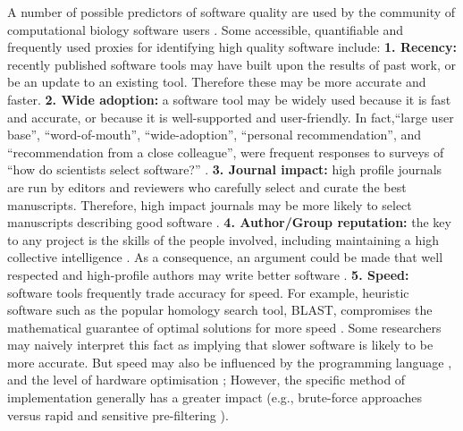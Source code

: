 \documentclass[fleqn,10pt]{SelfArx} %
\begin{document}
A number of possible predictors of software quality are used by the
community of computational biology software users \cite{Hannay2009-cf,Joppa2013-vj,Loman2015-bw}. 
Some accessible, quantifiable and frequently used proxies for identifying high quality
software include: \textbf{1. Recency:} recently published software
tools may have built upon the results of past work, or be an update to
an existing tool. Therefore these may be more accurate and
faster. \textbf{2. Wide adoption:} a software tool may be widely used
because it is fast and accurate, or because it is well-supported and
user-friendly. In fact,``large user base'', ``word-of-mouth'',
``wide-adoption'', ``personal recommendation'', and ``recommendation from a
close colleague'', were frequent responses to surveys of ``how do
scientists select software?''
\cite{Hannay2009-cf,Joppa2013-vj,Loman2015-bw}. \textbf{3. Journal
impact:} high profile journals are run by editors and reviewers who
carefully select and curate the best manuscripts. Therefore, high
impact journals may be more likely to select manuscripts describing
good software \cite{Garfield1955-wf}. \textbf{4. Author/Group
reputation:} the key to any project is the skills of the people
involved, including maintaining a high collective intelligence
\cite{Joppa2013-vj,Woolley2010-ld,Cheruvelil2014-xn}. As a
consequence, an argument could be made that well respected and
high-profile authors may write better software
\cite{Hirsch2005-mt,Bornmann2008-il}. \textbf{5. Speed:} software tools
frequently trade accuracy for speed. For example, heuristic
software such as the popular homology search tool, BLAST, compromises
the mathematical guarantee of optimal solutions for more speed
\cite{Altschul1990-ht,Altschul1997-ga}. Some researchers may naively
interpret this fact as implying that slower software is likely to be more
accurate. But speed may also be influenced by the programming language
\cite{Fourment2008-vl}, and the level of hardware optimisation
\cite{Farrar2007-ky,Dematte2010-ph};
However, the specific method of implementation generally has a greater impact (e.g., brute-force approaches versus
rapid and sensitive pre-filtering
\cite{Schaeffer1989-mu,Papadimitriou_undated-bo,leiserson2020there}).

\end{document}
